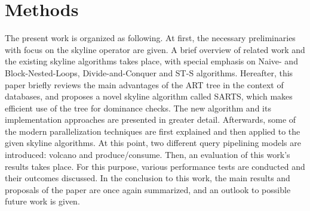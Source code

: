 \section{Methods}
The present work is organized as following. At first, the necessary preliminaries with focus on the skyline operator are given. A brief overview of related work and the existing skyline algorithms takes place, with special emphasis on Naive- and Block-Nested-Loops, Divide-and-Conquer and ST-S algorithms. Hereafter, this paper briefly reviews the main advantages of the ART tree in the context of databases, and proposes a novel skyline algorithm called SARTS, which makes efficient use of the tree for dominance checks. The new algorithm and its implementation approaches are presented in greater detail. Afterwards, some of the modern parallelization techniques are first explained and then applied to the given skyline algorithms. At this point, two different query pipelining models are introduced: volcano and produce/consume. Then, an evaluation of this work's results takes place. For this purpose, various performance tests are conducted and their outcomes discussed. In the conclusion to this work, the main results and proposals of the paper are once again summarized, and an outlook to possible future work is given. 
 


